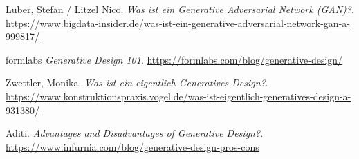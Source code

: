 \begin{thebibliography}{99}
     Luber, Stefan / Litzel Nico. \textit{Was ist ein Generative Adversarial Network (GAN)?}. \url{https://www.bigdata-insider.de/was-ist-ein-generative-adversarial-network-gan-a-999817/}

     formlabs \textit{Generative Design 101}. \url{https://formlabs.com/blog/generative-design/}

     Zwettler, Monika. \textit{Was ist ein eigentlich Generatives Design?}. \url{https://www.konstruktionspraxis.vogel.de/was-ist-eigentlich-generatives-design-a-931380/}

     Aditi. \textit{Advantages and Disadvantages of Generative Design?}. \url{https://www.infurnia.com/blog/generative-design-pros-cons}


\end{thebibliography}
